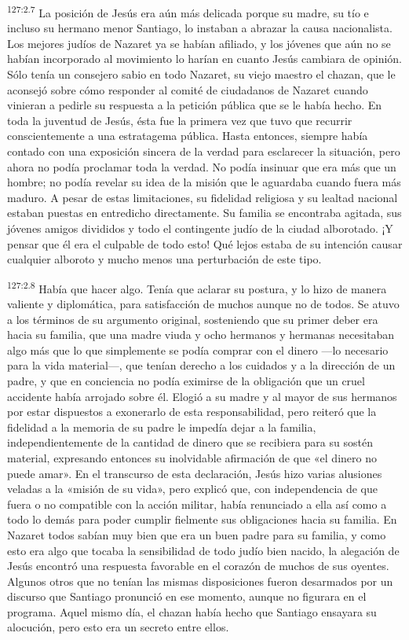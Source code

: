 \par
\textsuperscript{127:2.7} La posición de Jesús era aún más delicada porque su madre, su tío e incluso su hermano menor Santiago, lo instaban a abrazar la causa nacionalista. Los mejores judíos de Nazaret ya se habían afiliado, y los jóvenes que aún no se habían incorporado al movimiento lo harían en cuanto Jesús cambiara de opinión. Sólo tenía un consejero sabio en todo Nazaret, su viejo maestro el chazan, que le aconsejó sobre cómo responder al comité de ciudadanos de Nazaret cuando vinieran a pedirle su respuesta a la petición pública que se le había hecho. En toda la juventud de Jesús, ésta fue la primera vez que tuvo que recurrir conscientemente a una estratagema pública. Hasta entonces, siempre había contado con una exposición sincera de la verdad para esclarecer la situación, pero ahora no podía proclamar toda la verdad. No podía insinuar que era más que un hombre; no podía revelar su idea de la misión que le aguardaba cuando fuera más maduro. A pesar de estas limitaciones, su fidelidad religiosa y su lealtad nacional estaban puestas en entredicho directamente. Su familia se encontraba agitada, sus jóvenes amigos divididos y todo el contingente judío de la ciudad alborotado. ¡Y pensar que él era el culpable de todo esto! Qué lejos estaba de su intención causar cualquier alboroto y mucho menos una perturbación de este tipo.

\par
\textsuperscript{127:2.8} Había que hacer algo. Tenía que aclarar su postura, y lo hizo de manera valiente y diplomática, para satisfacción de muchos aunque no de todos. Se atuvo a los términos de su argumento original, sosteniendo que su primer deber era hacia su familia, que una madre viuda y ocho hermanos y hermanas necesitaban algo más que lo que simplemente se podía comprar con el dinero ---lo necesario para la vida material---, que tenían derecho a los cuidados y a la dirección de un padre, y que en conciencia no podía eximirse de la obligación que un cruel accidente había arrojado sobre él. Elogió a su madre y al mayor de sus hermanos por estar dispuestos a exonerarlo de esta responsabilidad, pero reiteró que la fidelidad a la memoria de su padre le impedía dejar a la familia, independientemente de la cantidad de dinero que se recibiera para su sostén material, expresando entonces su inolvidable afirmación de que «el dinero no puede amar». En el transcurso de esta declaración, Jesús hizo varias alusiones veladas a la «misión de su vida», pero explicó que, con independencia de que fuera o no compatible con la acción militar, había renunciado a ella así como a todo lo demás para poder cumplir fielmente sus obligaciones hacia su familia. En Nazaret todos sabían muy bien que era un buen padre para su familia, y como esto era algo que tocaba la sensibilidad de todo judío bien nacido, la alegación de Jesús encontró una respuesta favorable en el corazón de muchos de sus oyentes. Algunos otros que no tenían las mismas disposiciones fueron desarmados por un discurso que Santiago pronunció en ese momento, aunque no figurara en el programa. Aquel mismo día, el chazan había hecho que Santiago ensayara su alocución, pero esto era un secreto entre ellos.

